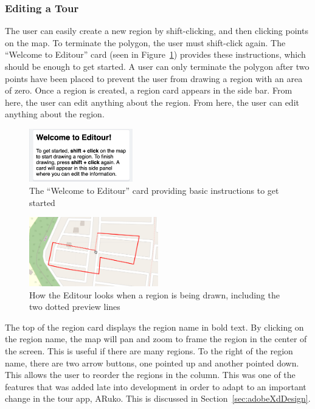 \documentclass[a4paper, 10pt, american, titlepage]{article}
\begin{document}
\subsubsection{Editing a Tour}
\label{sec:editingATour}

The user can easily create a new region by shift-clicking, and then clicking
points on the map.  To terminate the polygon, the user must shift-click again.
The ``Welcome to Editour'' card (seen in Figure~\ref{fig:welcomeCard}) provides
these instructions, which should be enough to get started.  A user can only
terminate the polygon after two points have been placed to prevent the user
from drawing a region with an area of zero. Once a region is created, a region
card appears in the side bar. From here, the user can edit anything about the
region. From here, the user can edit anything about the region.

\begin{figure}[h]
	\centering
	\includegraphics[width=0.4\textwidth]{welcome-card-editour.png}
    \caption{The ``Welcome to Editour'' card providing basic instructions to
    get started}
	\label{fig:welcomeCard}
\end{figure}

\begin{figure}[h]
	\centering
	\includegraphics[width=0.5\textwidth]{drawing-region-editour.png}
    \caption{How the Editour looks when a region is being drawn, including the
    two dotted preview lines}
	\label{fig:drawingRegion}
\end{figure}

The top of the region card displays the region name in bold text. By clicking
on the region name, the map will pan and zoom to frame the region in the center
of the screen. This is useful if there are many regions. To the right of the
region name, there are two arrow buttons, one pointed up and another pointed
down. This allows the user to reorder the regions in the column. This was one
of the features that was added late into development in order to adapt to an
important change in the tour app, ARuko. This is discussed in
Section~\ref{sec:adobeXdDesign}.
\end{document}
